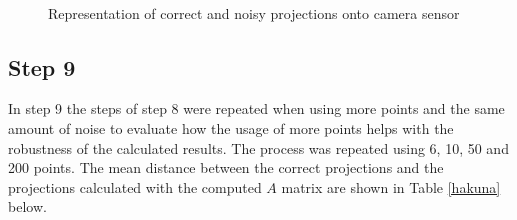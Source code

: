 \documentclass[journal]{IEEEtran}
\begin{document}
\begin{figure}[H]
	\centering

	\\
	\caption{Representation of correct and noisy projections onto camera sensor}
	\label{fig:noisycc}
\end{figure}



\subsection{Step 9}

In step 9 the steps of step 8 were repeated when using more points and the same amount of noise to evaluate how the usage of more points helps with the robustness of the calculated results. The process was repeated using 6, 10, 50 and 200 points. The mean distance between the correct projections and the projections calculated with the computed $A$ matrix are shown in Table \ref{hakuna} below.
\end{document}
